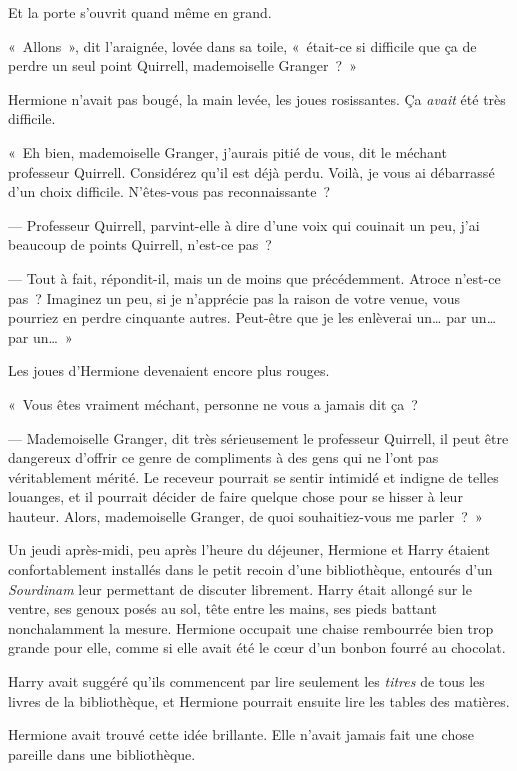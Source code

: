 Et la porte s'ouvrit quand même en grand.

«~Allons~», dit l'araignée, lovée dans sa toile, «~était-ce si difficile que ça de perdre un seul point Quirrell, mademoiselle Granger~?~»

Hermione n'avait pas bougé, la main levée, les joues rosissantes. Ça \emph{avait} été très difficile.

«~Eh bien, mademoiselle Granger, j'aurais pitié de vous, dit le méchant professeur Quirrell. Considérez qu'il est déjà perdu. Voilà, je vous ai débarrassé d'un choix difficile. N'êtes-vous pas reconnaissante~?

--- Professeur Quirrell, parvint-elle à dire d'une voix qui couinait un peu, j'ai beaucoup de points Quirrell, n'est-ce pas~?

--- Tout à fait, répondit-il, mais un de moins que précédemment. Atroce n'est-ce pas~? Imaginez un peu, si je n'apprécie pas la raison de votre venue, vous pourriez en perdre cinquante autres. Peut-être que je les enlèverai un… par un… par un…~»

Les joues d'Hermione devenaient encore plus rouges.

«~Vous êtes vraiment méchant, personne ne vous a jamais dit ça~?

--- Mademoiselle Granger, dit très sérieusement le professeur Quirrell, il peut être dangereux d'offrir ce genre de compliments à des gens qui ne l'ont pas véritablement mérité. Le receveur pourrait se sentir intimidé et indigne de telles louanges, et il pourrait décider de faire quelque chose pour se hisser à leur hauteur. Alors, mademoiselle Granger, de quoi souhaitiez-vous me parler~?~»

\later

Un jeudi après-midi, peu après l'heure du déjeuner, Hermione et Harry étaient confortablement installés dans le petit recoin d'une bibliothèque, entourés d'un \emph{Sourdinam} leur permettant de discuter librement. Harry était allongé sur le ventre, ses genoux posés au sol, tête entre les mains, ses pieds battant nonchalamment la mesure. Hermione occupait une chaise rembourrée bien trop grande pour elle, comme si elle avait été le cœur d'un bonbon fourré au chocolat.

Harry avait suggéré qu'ils commencent par lire seulement les \emph{titres} de tous les livres de la bibliothèque, et Hermione pourrait ensuite lire les tables des matières.

Hermione avait trouvé cette idée brillante. Elle n'avait jamais fait une chose pareille dans une bibliothèque.

